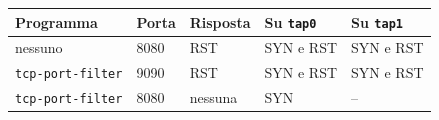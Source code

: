 \begin{tabular}{@{}lllll@{}}
    \toprule
    \textbf{Programma} & \textbf{Porta} & \textbf{Risposta} & \textbf{Su \texttt{tap0}} & \textbf{Su \texttt{tap1}} \\
    \midrule
    nessuno & 8080 & RST & SYN e RST & SYN e RST \\
    \texttt{tcp-port-filter} & 9090 & RST & SYN e RST & SYN e RST \\
    \texttt{tcp-port-filter} & 8080 & nessuna & SYN & -- \\
    \bottomrule
\end{tabular}